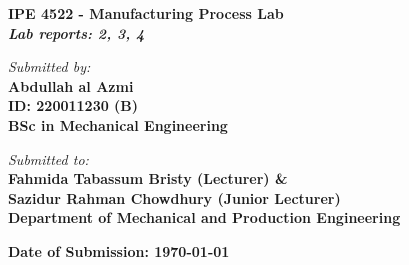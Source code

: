 \documentclass[12pt]{article}
\begin{document}
\begin{titlepage}
    \begin{center}
        \vspace*{2cm}
        {\Huge \textbf{ IPE 4522 - Manufacturing Process Lab}} \\
        \vspace{1cm}
        \Large{\textbf{\textit{Lab reports: 2, 3, 4}}} \\

        \vfill

        \textit{\large Submitted by:} \\
        \vspace{0.3cm}
        \textbf{Abdullah al Azmi} \\
        \textbf{ID: 220011230 (B)} \\
        \textbf{BSc in Mechanical Engineering} \\

        \vfill

        \textit{\large Submitted to:} \\
        \vspace{0.3cm}
        \textbf{\Large Fahmida Tabassum Bristy (Lecturer) \&} \\
        \textbf{\Large Sazidur Rahman Chowdhury (Junior Lecturer)} \\
        \textbf{Department of Mechanical and Production Engineering} \\

        \vfill

        \textbf{Date of Submission: \today}
        \vspace*{1cm}
    \end{center}
\end{titlepage}
\end{document}
